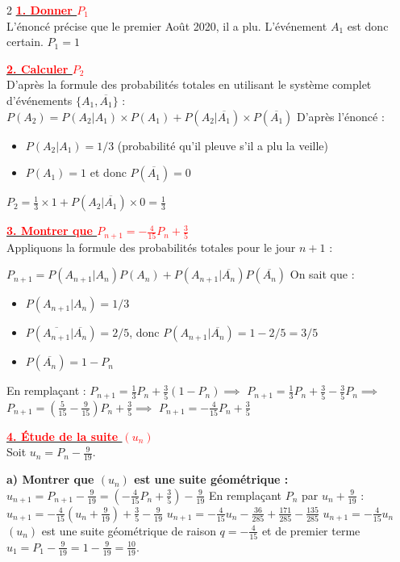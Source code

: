 \documentclass[12pt,a4paper]{article}
\begin{document}
\begin{multicols}{2}
\setlength{\columnseprule}{0.1mm} %
\underline{\textbf{\textcolor{red}{1. Donner $P_1$}}}\\
L'énoncé précise que le premier Août 2020, il a plu. L'événement $A_1$ est donc certain.
$ P_1 = 1 $

\underline{\textbf{\textcolor{red}{2. Calculer $P_2$}}}\\
D'après la formule des probabilités totales en utilisant le système complet d'événements $\{A_1, \overline{A_1}\}$ :
$ P(A_2) = P(A_2 | A_1) \times P(A_1) + P(A_2 | \overline{A_1}) \times P(\overline{A_1}) $
D'après l'énoncé :
\begin{itemize}
    \item $P(A_2 | A_1) = 1/3$ (probabilité qu'il pleuve s'il a plu la veille)
    \item $P(A_1) = 1$ et donc $P(\overline{A_1}) = 0$
\end{itemize}
$ P_2 = \frac{1}{3} \times 1 + P(A_2 | \overline{A_1}) \times 0 = \frac{1}{3} $

\underline{\textbf{\textcolor{red}{3. Montrer que $P_{n+1} = -\frac{4}{15} P_n + \frac{3}{5}$}}}\\
Appliquons la formule des probabilités totales pour le jour $n+1$ :

$ P_{n+1} = P(A_{n+1} | A_n) P(A_n) + P(A_{n+1} | \overline{A_n}) P(\overline{A_n}) $
On sait que :
\begin{itemize}
    \item $P(A_{n+1} | A_n) = 1/3$
    \item $P(\overline{A_{n+1}} | \overline{A_n}) = 2/5$, donc $P(A_{n+1} | \overline{A_n}) = 1 - 2/5 = 3/5$
    \item $P(\overline{A_n}) = 1 - P_n$
\end{itemize}
En remplaçant :
$ P_{n+1} = \frac{1}{3} P_n + \frac{3}{5} (1 - P_n) \implies$
$ P_{n+1} = \frac{1}{3} P_n + \frac{3}{5} - \frac{3}{5} P_n \implies$
$ P_{n+1} = \left( \frac{5}{15} - \frac{9}{15} \right) P_n + \frac{3}{5} \implies$
$ P_{n+1} = -\frac{4}{15} P_n + \frac{3}{5} $

\underline{\textbf{\textcolor{red}{4. Étude de la suite $(u_n)$}}}\\
Soit $u_n = P_n - \frac{9}{19}$.

\textbf{a) Montrer que $(u_n)$ est une suite géométrique :}
$ u_{n+1} = P_{n+1} - \frac{9}{19} = \left( -\frac{4}{15} P_n + \frac{3}{5} \right) - \frac{9}{19} $
En remplaçant $P_n$ par $u_n + \frac{9}{19}$ :
$ u_{n+1} = -\frac{4}{15} \left( u_n + \frac{9}{19} \right) + \frac{3}{5} - \frac{9}{19} $
$ u_{n+1} = -\frac{4}{15} u_n - \frac{36}{285} + \frac{171}{285} - \frac{135}{285} $
$ u_{n+1} = -\frac{4}{15} u_n $
$(u_n)$ est une suite géométrique de raison $q = -\frac{4}{15}$ et de premier terme $u_1 = P_1 - \frac{9}{19} = 1 - \frac{9}{19} = \frac{10}{19}$.


\end{multicols}
\end{document}
